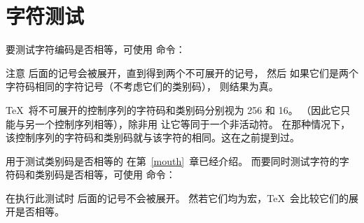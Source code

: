 \documentclass{book}
\begin{document}
\section{字符测试}

要测试字符编码是否相等，可使用  命令：
\begin{disp}\end{disp}
注意  后面的记号会被展开，直到得到两个不可展开的记号，
然后  如果它们是两个字符码相同的字符记号（不考虑它们的类别码），
则结果为真。


\TeX\ 将不可展开的控制序列的字符码和类别码分别视为 256 和 16。%
（因此它只能与另一个控制序列相等），除非用  让它等同于一个非活动符。
在那种情况下，该控制序列的字符码和类别码就与该字符的相同。这在之前提到过。


用于测试类别码是否相等的  在第~\ref{mouth}~章已经介绍。
而要同时测试字符的字符码和类别码是否相等，可使用  命令：
\begin{disp}\end{disp}
在执行此测试时  后面的记号不会被展开。
然若它们均为宏，\TeX\ 会比较它们的展开是否相等。
\end{document}
